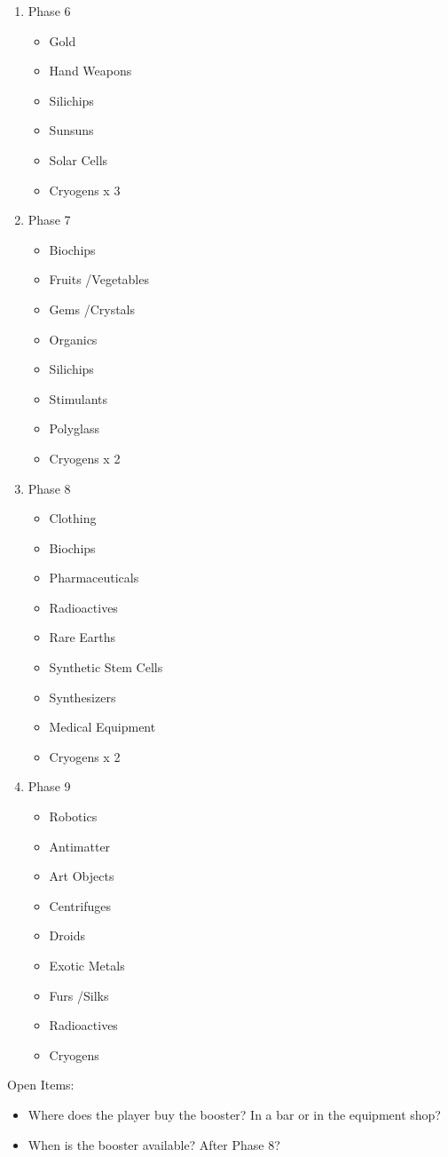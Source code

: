 \begin{enumerate}
 \item Phase 6
 \begin{itemize}
  \item Gold
  \item Hand Weapons
  \item Silichips
  \item Sunsuns
  \item Solar Cells
  \item Cryogens x 3
 \end{itemize}

 \item Phase 7
 \begin{itemize}
  \item Biochips
  \item Fruits \slash Vegetables
  \item Gems \slash Crystals
  \item Organics
  \item Silichips
  \item Stimulants
  \item Polyglass
  \item Cryogens x 2
 \end{itemize}

 \item Phase 8
 \begin{itemize}
  \item Clothing
  \item Biochips
  \item Pharmaceuticals
  \item Radioactives
  \item Rare Earths
  \item Synthetic Stem Cells
  \item Synthesizers
  \item Medical Equipment
  \item Cryogens x 2
 \end{itemize}

 \item Phase 9
 \begin{itemize}
  \item Robotics
  \item Antimatter
  \item Art Objects
  \item Centrifuges
  \item Droids
  \item Exotic Metals
  \item Furs \slash Silks
  \item Radioactives
  \item Cryogens
 \end{itemize}
\end{enumerate}

Open Items:
\begin{itemize}
\item Where does the player buy the booster?  In a bar or in the equipment
shop?
\item When is the booster available?  After Phase 8?
\end{itemize}
